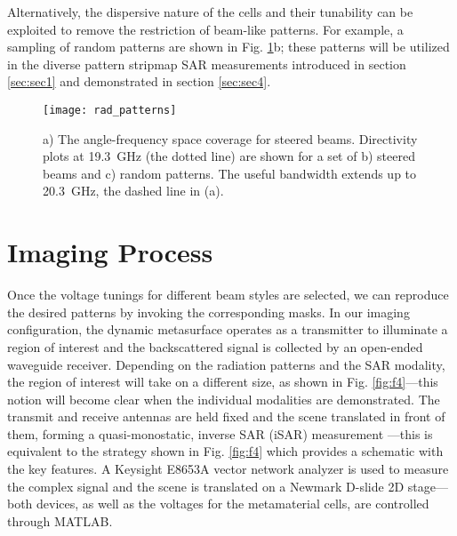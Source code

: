 \documentclass[journal]{IEEEtran}
\begin{document}
Alternatively, the dispersive nature of the cells and their tunability can be exploited to remove the restriction of beam-like patterns. For example, a sampling of random patterns are shown in Fig. \ref{fig:f3}b; these patterns will be utilized in the diverse pattern stripmap SAR measurements introduced in section \ref{sec:sec1} and demonstrated in section \ref{sec:sec4}.


\begin{figure} 
	\centering
	\texttt{[image: rad\_patterns]}
	\caption{\label{fig:f3}a) The angle-frequency space coverage for steered beams. Directivity plots at \SI{19.3}{\giga\hertz} (the dotted line) are shown for a set of b) steered beams and c) random patterns. The useful bandwidth extends up to \SI{20.3}{\giga\hertz}, the dashed line in (a).}
\end{figure}


\section{Imaging Process}
\label{sec:sec3}

Once the voltage tunings for different beam styles are selected, we can reproduce the desired patterns by invoking the corresponding masks. In our imaging configuration, the dynamic metasurface operates as a transmitter to illuminate a region of interest and the backscattered signal is collected by an open-ended waveguide receiver. Depending on the radiation patterns and the SAR modality, the region of interest will take on a different size, as shown in Fig. \ref{fig:f4}---this notion will become clear when the individual modalities are demonstrated. The transmit and receive antennas are held fixed and the scene translated in front of them, forming a quasi-monostatic, inverse SAR (iSAR) measurement \cite{soumekh1999SAR}---this is equivalent to the strategy shown in Fig. \ref{fig:f4} which provides a schematic with the key features. A Keysight E8653A vector network analyzer is used to measure the complex signal and the scene is translated on a Newmark D-slide 2D stage---both devices, as well as the voltages for the metamaterial cells, are controlled through MATLAB.
\end{document}
